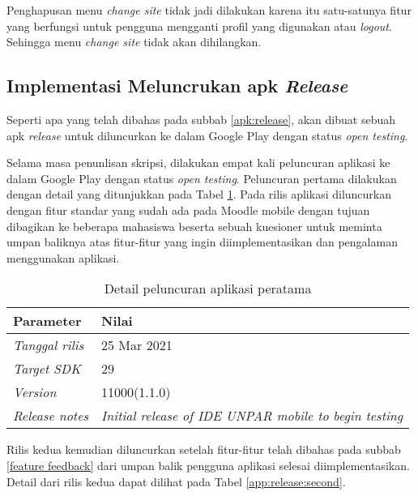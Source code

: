 Penghapusan menu \textit{change site} tidak jadi dilakukan karena itu satu-satunya fitur yang berfungsi untuk pengguna mengganti profil yang digunakan atau \textit{logout}. Sehingga menu \textit{change site} tidak akan dihilangkan.

\subsection{Implementasi Meluncrukan apk \textit{Release}}
Seperti apa yang telah dibahas pada subbab \ref{apk:release}, akan dibuat sebuah apk \textit{release} untuk diluncurkan ke dalam Google Play dengan status \textit{open testing}. 

Selama masa penunlisan skripsi, dilakukan empat kali peluncuran aplikasi ke dalam Google Play dengan status \textit{open testing}. Peluncuran pertama dilakukan dengan detail yang ditunjukkan pada Tabel \ref{app:release:first}. Pada rilis aplikasi diluncurkan dengan fitur standar yang sudah ada pada Moodle mobile dengan tujuan dibagikan ke beberapa mahasiswa beserta sebuah kuesioner untuk meminta umpan baliknya atas fitur-fitur yang ingin diimplementasikan dan pengalaman menggunakan aplikasi.

\begin{table}[ht]
\caption{Detail peluncuran aplikasi peratama}
\centering
\begin{tabular}{|l | l |}
\hline
\textbf{Parameter} & \textbf{Nilai} \\  \hline
\textit{Tanggal rilis}  &  25 Mar 2021 \\ \hline
\textit{Target SDK} & 29 \\ \hline
\textit{Version} &  11000(1.1.0) \\ \hline
\textit{Release notes} & \textit{Initial release of IDE UNPAR mobile to begin testing} \\ 
\hline
\end{tabular}
\label{app:release:first}
\end{table}

Rilis kedua kemudian diluncurkan setelah fitur-fitur telah dibahas pada subbab \ref{feature feedback} dari umpan balik pengguna aplikasi selesai diimplementasikan. Detail dari rilis kedua dapat dilihat pada Tabel \ref{app:release:second}. 

